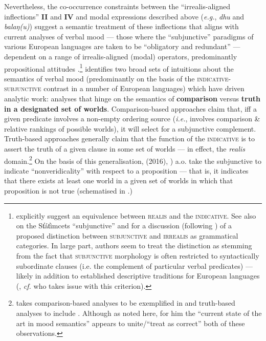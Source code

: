 Nevertheless, the co-occurrence constraints between the ``irrealis-aligned inflections'' \textbf{II} and \textbf{IV} and modal expressions described above (\textit{e.g.}, \textit{dhu }and\textit{ balaŋ(u)}) suggest a semantic treatment of these inflections that aligns with current analyses of verbal mood --- those where the ``subjunctive'' paradigms of various European languages are taken to be ``obligatory and redundant'' --- dependent on a range of irrealis-aligned (modal) operators, predominantly propositional attitudes \citep{Palmer2001}.\footnote{\citet[238]{Chung} explicitly suggest an equivalence between \textsc{realis} and the \textsc{indicative}. See also \citealt{Matthewson2010} on the St̓át̓imcets ``subjunctive'' and for a discussion (following \citealt{Palmer2001}) of a proposed distinction between \textsc{subjunctive} and \textsc{irrealis} as grammatical categories. In large part, authors seem to treat the distinction as stemming from the fact that \textsc{subjunctive} morphology is often restricted to syntactically subordinate clauses (i.e. the complement of particular verbal predicates) --- likely in addition to established descriptive traditions for European languages (\citealp[see also][169\textit{ff}]{Mauri2016}, \textit{cf. }\citet[13, fn 9]{Matthewson2010} who takes issue with this criterion).} \citet[§ 2.2]{Portner2018a} identifies two broad sets of intuitions about the semantics of verbal mood (predominantly on the basis of the \textsc{indicative-subjunctive} contrast in a number of European languages) which have driven analytic work: analyses that hinge on the semantics of \textbf{comparison} versus \textbf{truth in a designated set of worlds}. Comparison-based approaches claim that, iff a given predicate involves a non-empty ordering source (\textit{i.e.}, involves comparison \& relative rankings of possible worlds), it will select for a subjunctive complement. Truth-based approaches generally claim that the function  of the \textsc{indicative} is to assert the truth of a given clause in some set of worlds --- in effect, the \textit{realis} domain.\footnote{\citet{Portner2018a} takes comparison-based analyses to be exemplified in \citealt{Portner2012,Anand2013,Giorgi1997,Villalta2008} and truth-based analyses to include \citealt{Giannakidou2011,Farkas1992,Farkas2003,Huntley1984,Quer2001,Portner1997}. Although as noted here, for him the ``current state of the art in mood semantics'' appears to unite/``treat as correct'' both of these observations.} On the basis of this generalisation, \citeauthor{Gian2016} (2016), \citealp{Giannakidou2020}) a.o. take the subjunctive to indicate ``nonveridicality'' with respect to a proposition --- that is, it indicates that there exists at least one world in a given set of worlds in which that proposition is not true (schematised in \nextx.)

